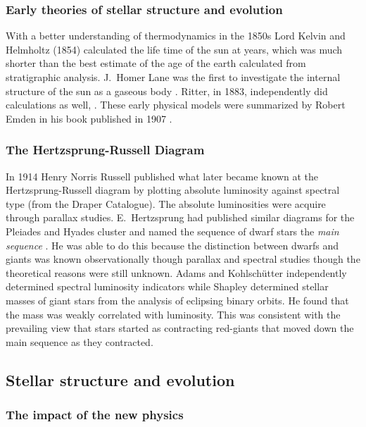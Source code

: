 \subsubsection{Early theories of stellar structure and evolution}

With a better understanding of thermodynamics in the
1850s Lord Kelvin and Helmholtz (1854) calculated the life time of the
sun at  years, which was much shorter than the best
estimate of the age of the earth calculated from stratigraphic
analysis. J.~Homer Lane was the first to investigate the internal
structure of the sun as a gaseous body \cite{Lane1870}. Ritter, in
1883, independently did calculations as well, \cite{Ritter1883,
Ritter1883a, Ritter1898}. These early physical
models were summarized by Robert Emden in his book 
published in 1907 \cite{Emden1907}.

\subsubsection{The Hertzsprung-Russell Diagram}

In 1914  Henry Norris Russell\cite{Russell1914a,
Russell1914b} published what later became known at the
Hertzsprung-Russell diagram by plotting absolute luminosity against
spectral type (from the Draper Catalogue). The absolute luminosities
were acquire through parallax studies. E.~Hertzsprung
 had published similar diagrams for the Pleiades
and Hyades cluster and named the sequence of dwarf stars
the \textit{main sequence} \cite{Hertzsprung1911}.  He was able to do
this because the distinction between dwarfs and giants was known
observationally though parallax and spectral studies though the
theoretical reasons were still unknown. Adams and 
Kohlschütter \cite{Adams1914} independently determined spectral
luminosity indicators while Shapley determined stellar masses of giant
stars from the analysis of eclipsing binary orbits. He found that the
mass was weakly correlated with luminosity.  This was consistent with
the prevailing view that stars started as contracting red-giants that
moved down the main sequence as they contracted.


\subsection{Stellar structure and evolution}

\subsubsection{The impact of the new physics}

